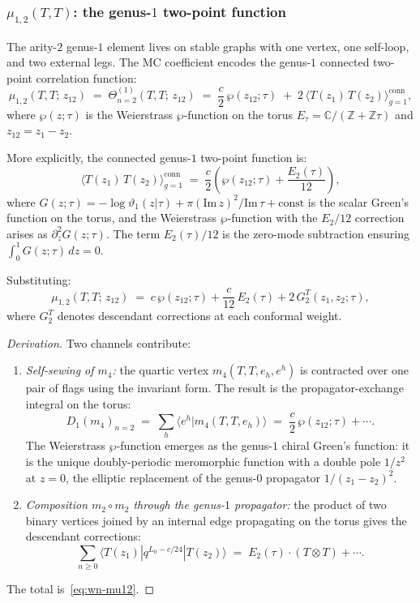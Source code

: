 \documentclass[11pt]{article}
\begin{document}
\subsubsection{$\mu_{1,2}(T,T)$: the genus-$1$ two-point function}

The arity-$2$ genus-$1$ element lives on stable graphs with
one vertex, one self-loop, and two external legs.  The MC coefficient
encodes the genus-$1$ connected two-point correlation function:
\begin{equation}\label{eq:wn-mu12}
\mu_{1,2}(T,T;\,z_{12})
\;=\;
\Theta^{(1)}_{n=2}(T,T;\,z_{12})
\;=\;
\frac{c}{2}\,\wp(z_{12};\tau)
\;+\;
2\,\langle T(z_1)\,T(z_2) \rangle_{g=1}^{\mathrm{conn}},
\end{equation}
where $\wp(z;\tau)$ is the Weierstrass $\wp$-function on the
torus $E_\tau = \mathbb{C}/(\mathbb{Z} + \mathbb{Z}\tau)$ and
$z_{12} = z_1 - z_2$.

More explicitly, the connected genus-$1$ two-point function is:
\begin{equation}\label{eq:wn-mu12-explicit}
\langle T(z_1)\,T(z_2) \rangle_{g=1}^{\mathrm{conn}}
\;=\;
\frac{c}{2}\left(\wp(z_{12};\tau) + \frac{E_2(\tau)}{12}\right),
\end{equation}
where $G(z;\tau) = -\log\vartheta_1(z|\tau)
+ \pi(\mathrm{Im}\,z)^2/\mathrm{Im}\,\tau + \mathrm{const}$
is the scalar Green's function on the torus, and the Weierstrass
$\wp$-function with the $E_2/12$ correction arises as
$\partial_z^2 G(z;\tau)$.  The term $E_2(\tau)/12$ is the
zero-mode subtraction ensuring $\int_0^1 G(z;\tau)\,dz = 0$.

Substituting:
\begin{equation}\label{eq:wn-mu12-full}
\mu_{1,2}(T,T;\,z_{12})
\;=\;
c\,\wp(z_{12};\tau) + \frac{c}{12}\,E_2(\tau)
+ 2\,G_2^T(z_1,z_2;\tau),
\end{equation}
where $G_2^T$ denotes descendant corrections at each conformal weight.

\begin{proof}[Derivation]
Two channels contribute:
\begin{enumerate}[label=\textup{(\roman*)}]
\item \emph{Self-sewing of $m_4$:} the quartic vertex $m_4(T,T,e_h,e^h)$
  is contracted over one pair of flags using the invariant form.  The
  result is the propagator-exchange integral on the torus:
  \[
  D_1(m_4)_{n=2}
  \;=\;
  \sum_h \langle e^h | m_4(T,T,e_h) \rangle
  \;=\;
  \frac{c}{2}\,\wp(z_{12};\tau) + \cdots.
  \]
  The Weierstrass $\wp$-function emerges as the genus-$1$ chiral Green's
  function: it is the unique doubly-periodic meromorphic function with
  a double pole $1/z^2$ at $z = 0$, the elliptic replacement of the
  genus-$0$ propagator $1/(z_1-z_2)^2$.

\item \emph{Composition $m_2 \circ m_2$ through the genus-$1$ propagator:}
  the product of two binary vertices joined by an internal edge
  propagating on the torus gives the descendant corrections:
  \[
  \sum_{n \geq 0} \langle T(z_1) | q^{L_0 - c/24} | T(z_2) \rangle
  \;=\;
  E_2(\tau)\cdot(T \otimes T) + \cdots.
  \]
\end{enumerate}
The total is~\eqref{eq:wn-mu12}.
\end{proof}
\end{document}
